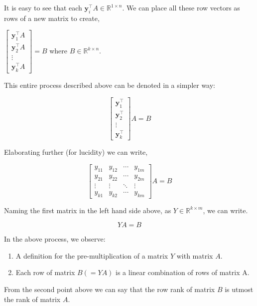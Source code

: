 \documentclass[a4paper]{article}
\begin{document}
It is easy to see that each $\boldsymbol{y}_i^{\top}A \in \mathbb{R}^{1 \times n}$. We can place all these row vectors as rows of a new matrix to create,

$\begin{bmatrix}
\boldsymbol{y}_1^{\top}A \\
\boldsymbol{y}_2^{\top}A \\
\vdots \\
\boldsymbol{y}_k^{\top}A
\end{bmatrix} = B$ where $B \in \mathbb{R}^{k \times n}$.

This entire process described above can be denoted in a simpler way:

\begin{equation}
\begin{bmatrix}
\boldsymbol{y}_1^{\top} \\
\boldsymbol{y}_2^{\top} \\
\vdots \\
\boldsymbol{y}_k^{\top}
\end{bmatrix}A = B
\end{equation}

Elaborating further (for lucidity) we can write,

\begin{equation}
\begin{bmatrix}
y_{11} & y_{12} & \cdots & y_{1m} \\
y_{21} & y_{22} & \cdots & y_{2m} \\
\vdots & \vdots & \ddots & \vdots \\
y_{k1} & y_{k2} & \cdots & y_{km}
\end{bmatrix}A = B
\end{equation}


Naming the first matrix in the left hand side above, as $Y \in \mathbb{R}^{k \times m}$, we can write.

\begin{equation}
YA = B
\end{equation}

In the above process, we observe:

\begin{enumerate}
\item A definition for the pre-multiplication of a matrix $Y$ with matrix $A$.
\item Each row of matrix $B (=YA)$ is a linear combination of rows of matrix A.
\end{enumerate}

From the second point above we can say that the row rank of matrix $B$ is utmost the rank of matrix $A$.
\end{document}
